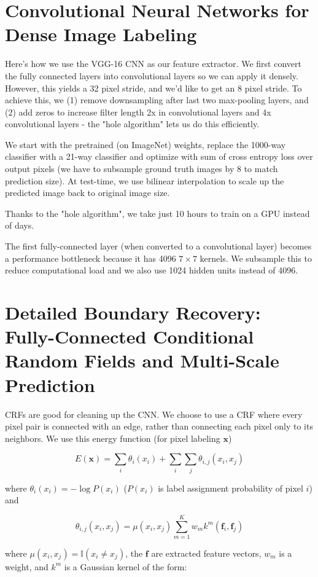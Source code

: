 \documentclass[a4paper]{article}
\begin{document}
\section{Convolutional Neural Networks for Dense Image Labeling}
Here's how we use the VGG-16 CNN as our feature extractor. We first convert the
fully connected layers into convolutional layers so we can apply it densely.
However, this yields a 32 pixel stride, and we'd like to get an 8 pixel stride.
To achieve this, we (1) remove downsampling after last two max-pooling layers,
and (2) add zeros to increase filter length 2x in convolutional layers and 4x
convolutional layers - the "hole algorithm" lets us do this efficiently.

We start with the pretrained (on ImageNet) weights, replace the 1000-way
classifier with a 21-way classifier and optimize with sum of cross entropy loss
over output pixels (we have to subsample ground truth images by 8 to match
prediction size). At test-time, we use bilinear interpolation to scale up the
predicted image back to original image size.

Thanks to the "hole algorithm", we take just 10 hours to train on a GPU instead
of days.

The first fully-connected layer (when converted to a convolutional layer)
becomes a performance bottleneck because it has 4096 $7 \times 7$ kernels. We
subsample this to reduce computational load and we also use 1024 hidden units
instead of 4096.

\section{Detailed Boundary Recovery: Fully-Connected Conditional Random Fields
and Multi-Scale Prediction}
CRFs are good for cleaning up the CNN. We choose to use a CRF where every pixel
pair is connected with an edge, rather than connecting each pixel only to its
neighbors. We use this energy function (for pixel labeling $\mathbf{x}$)

$$
E(\mathbf{x}) = \sum_i{\theta_i(x_i)} + \sum_i{\sum_j{\theta_{i, j}(x_i, x_j)}}
$$

where $\theta_i(x_i) = - \log P(x_i)$ ($P(x_i)$ is label assignment probability
of pixel $i$) and

$$
\theta_{i, j}(x_i, x_j) = \mu(x_i, x_j)\sum_{m=1}^K{
w_m k^m(\mathbf{f}_i, \mathbf{f}_j)
}
$$

where $\mu(x_i, x_j) = \mathbb{I}(x_i \ne x_j)$, the $\mathbf{f}$ are extracted
feature vectors, $w_m$ is a weight, and $k^m$ is a Gaussian kernel of the form:
\end{document}
